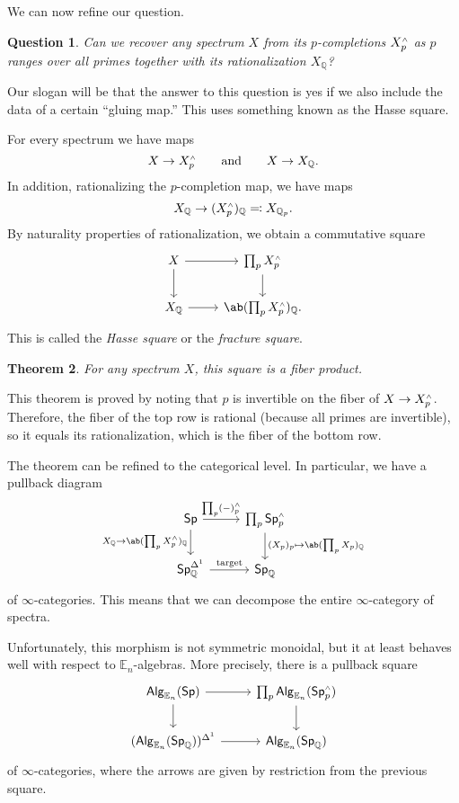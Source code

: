 \documentclass[10pt, oneside]{memoir}
\newtheorem{thm}{Theorem}[subsection]
\newtheorem{quest}[thm]{Question}
\theoremstyle{definition}
\theoremstyle{remark}
\theoremstyle{plain}
\theoremstyle{definition}
\theoremstyle{remark}
\newcommand{\Q}{\mathbb{Q}}
\newcommand{\E}{\mathbb{E}}
\newcommand{\mr}[1]{\mathrm{#1}}
\newcommand{\ms}[1]{\mathsf{#1}}
\newcommand{\1}{\mathbf{1}}
\newcommand{\2}{\mathbf{2}}
\newcommand{\3}{\mathbf{3}}
\newcommand{\sw}{\mathsmaller{\wedge}}
\begin{document}
We can now refine our question.
\begin{quest}
    Can we recover any spectrum $X$ from its $p$-completions $X_p^{\sw}$ as $p$ ranges over all primes together with its rationalization $X_{\Q}$?
\end{quest}

Our slogan will be that the answer to this question is yes if we also include the data of a certain ``gluing map.'' This uses something known as the Hasse square.

For every spectrum we have maps
\[ X \to X_p^{\sw} \qquad \text{and} \qquad X \to X_{\Q}. \]
In addition, rationalizing the $p$-completion map, we have maps
\[ X_{\Q} \to (X_p^{\sw})_{\Q} \eqqcolon X_{\Q_p}. \]
By naturality properties of rationalization, we obtain a commutative square
\begin{equation*}
\begin{tikzcd}
    X \ar{r} \ar{d} & \prod_p X_p^{\sw} \ar{d} \\
    X_{\Q} \ar{r} & \ab(\prod_p X_{p}^{\sw})_{\Q}.
\end{tikzcd}
\end{equation*}
This is called the \textit{Hasse square} or the \textit{fracture square}.

\begin{thm}
    For any spectrum $X$, this square is a fiber product.
\end{thm}

This theorem is proved by noting that $p$ is invertible on the fiber of $X \to X_p^{\sw}$. Therefore, the fiber of the top row is rational (because all primes are invertible), so it equals its rationalization, which is the fiber of the bottom row.

The theorem can be refined to the categorical level. In particular, we have a pullback diagram
\begin{equation*}
\begin{tikzcd}
    \ms{Sp} \ar{r}{\prod_p (-)_p^{\sw}} \ar{d}[swap]{X_{\Q} \to \ab(\prod_p X_p^{\sw})_{\Q}} & \prod_p \ms{Sp}_p^{\sw} \ar{d}{(X_p)_p \mapsto \ab(\prod_p X_p)_{\Q}} \\
    \ms{Sp}_{\Q}^{\Delta^1} \ar{r}{\mr{target}} & \ms{Sp}_{\Q}
\end{tikzcd}
\end{equation*}
of $\infty$-categories. This means that we can decompose the entire $\infty$-category of spectra.

Unfortunately, this morphism is not symmetric monoidal, but it at least behaves well with respect to $\E_n$-algebras. More precisely, there is a pullback square
\begin{equation*}
\begin{tikzcd}
    \ms{Alg}_{\E_n}(\ms{Sp}) \ar{r} \ar{d} & \prod_p \ms{Alg}_{\E_n}(\ms{Sp}_p^{\sw}) \ar{d} \\
    (\ms{Alg}_{\E_n}(\ms{Sp}_{\Q}))^{\Delta^1} \ar{r} & \ms{Alg}_{\E_n}(\ms{Sp}_{\Q})
\end{tikzcd}
\end{equation*}
of $\infty$-categories, where the arrows are given by restriction from the previous square.
\end{document}
